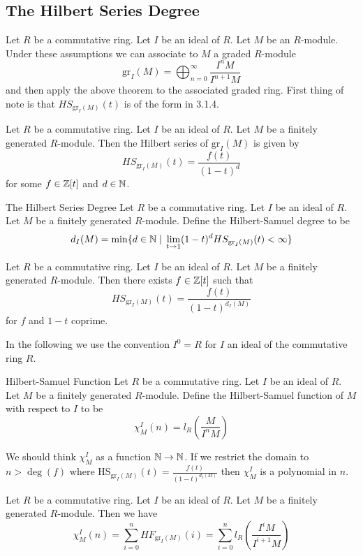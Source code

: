 \documentclass[a4paper]{article}
\begin{document}
\subsection{The Hilbert Series Degree}
Let $R$ be a commutative ring. Let $I$ be an ideal of $R$. Let $M$ be an $R$-module. Under these assumptions we can associate to $M$ a graded $R$-module $$\text{gr}_I(M)=\bigoplus_{n=0}^\infty\frac{I^nM}{I^{n+1}M}$$ and then apply the above theorem to the associated graded ring. First thing of note is that $HS_{\text{gr}_I(M)}(t)$ is of the form in 3.1.4. 

\begin{prp}{}{} Let $R$ be a commutative ring. Let $I$ be an ideal of $R$. Let $M$ be a finitely generated $R$-module. Then the Hilbert series of $\text{gr}_I(M)$ is given by $$HS_{\text{gr}_I(M)}(t)=\frac{f(t)}{(1-t)^d}$$ for some $f\in\mathbb{Z}[t]$ and $d\in\mathbb{N}$. 
\end{prp}

\begin{defn}{The Hilbert Series Degree}{} Let $R$ be a commutative ring. Let $I$ be an ideal of $R$. Let $M$ be a finitely generated $R$-module. Define the Hilbert-Samuel degree to be $$d_I(M)=\min\{d\in\mathbb{N}\;|\;\lim_{t\to 1}(1-t)^dHS_{\text{gr}_I(M)}(t)<\infty\}$$ 
\end{defn}

\begin{prp}{}{} Let $R$ be a commutative ring. Let $I$ be an ideal of $R$. Let $M$ be a finitely generated $R$-module. Then there exists $f\in\mathbb{Z}[t]$ such that $$HS_{\text{gr}_I(M)}(t)=\frac{f(t)}{(1-t)^{d_I(M)}}$$ for $f$ and $1-t$ coprime. 
\end{prp}

In the following we use the convention $I^0=R$ for $I$ an ideal of the commutative ring $R$. 

\begin{defn}{Hilbert-Samuel Function}{} Let $R$ be a commutative ring. Let $I$ be an ideal of $R$. Let $M$ be a finitely generated $R$-module. Define the Hilbert-Samuel function of $M$ with respect to $I$ to be $$\chi_M^I(n)=l_R\left(\frac{M}{I^nM}\right)$$
\end{defn}

We should think $\chi_M^I$ as a function $\mathbb{N}\to\mathbb{N}$. If we restrict the domain to $n>\deg(f)$ where $\text{HS}_{\text{gr}_I(M)}(t)=\frac{f(t)}{(1-t)^{d_I(M)}}$ then $\chi_M^I$ is a polynomial in $n$. 

\begin{prp}{}{} Let $R$ be a commutative ring. Let $I$ be an ideal of $R$. Let $M$ be a finitely generated $R$-module. Then we have $$\chi_M^I(n)=\sum_{i=0}^nHF_{\text{gr}_I(M)}(i)=\sum_{i=0}^nl_R\left(\frac{I^iM}{I^{i+1}M}\right)$$
\end{prp}
\end{document}
